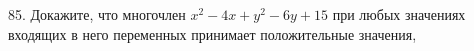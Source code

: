 85. Докажите, что многочлен $x^2-4x+y^2-6y+15$ при любых значениях входящих в него переменных принимает положительные значения,\\
